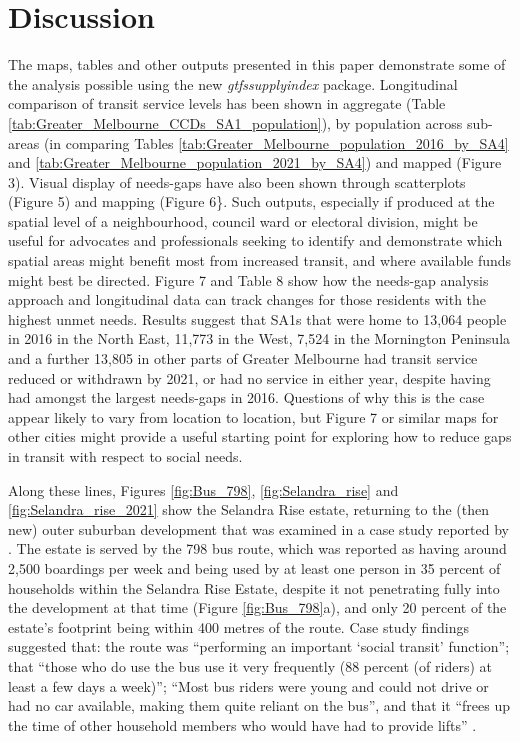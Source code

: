 \documentclass[preprint, 3p,
authoryear]{elsarticle} %
\begin{document}
\section{Discussion}\label{discussion}

The maps, tables and other outputs presented in this paper demonstrate
some of the analysis possible using the new \emph{gtfssupplyindex}
package. Longitudinal comparison of transit service levels has been
shown in aggregate (Table
\ref{tab:Greater_Melbourne_CCDs_SA1_population}), by population across
sub-areas (in comparing Tables
\ref{tab:Greater_Melbourne_population_2016_by_SA4} and
\ref{tab:Greater_Melbourne_population_2021_by_SA4}) and mapped (Figure
3). Visual display of needs-gaps have also been shown through
scatterplots (Figure 5) and mapping (Figure 6\}. Such outputs,
especially if produced at the spatial level of a neighbourhood, council
ward or electoral division, might be useful for advocates and
professionals seeking to identify and demonstrate which spatial areas
might benefit most from increased transit, and where available funds
might best be directed. Figure 7 and Table 8 show how the needs-gap
analysis approach and longitudinal data can track changes for those
residents with the highest unmet needs. Results suggest that SA1s that
were home to 13,064 people in 2016 in the North East, 11,773 in the
West, 7,524 in the Mornington Peninsula and a further 13,805 in other
parts of Greater Melbourne had transit service reduced or withdrawn by
2021, or had no service in either year, despite having had amongst the
largest needs-gaps in 2016. Questions of why this is the case appear
likely to vary from location to location, but Figure 7 or similar maps
for other cities might provide a useful starting point for exploring how
to reduce gaps in transit with respect to social needs.

Along these lines, Figures \ref{fig:Bus_798}, \ref{fig:Selandra_rise}
and \ref{fig:Selandra_rise_2021} show the Selandra Rise estate,
returning to the (then new) outer suburban development that was examined
in a case study reported by \citet{delbosc2015impact}. The estate is
served by the 798 bus route, which was reported as having around 2,500
boardings per week and being used by at least one person in 35 percent
of households within the Selandra Rise Estate, despite it not
penetrating fully into the development at that time (Figure
\ref{fig:Bus_798}a), and only 20 percent of the estate's footprint being
within 400 metres of the route. Case study findings suggested that: the
route was ``performing an important `social transit' function''; that
``those who do use the bus use it very frequently (88 percent (of
riders) at least a few days a week)''; ``Most bus riders were young and
could not drive or had no car available, making them quite reliant on
the bus'', and that it ``frees up the time of other household members
who would have had to provide lifts'' \citep[10]{delbosc2015impact}.
\end{document}
